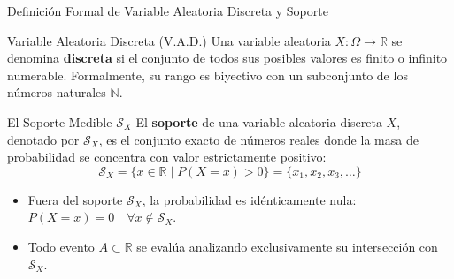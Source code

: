 \documentclass[10pt, aspectratio=169]{beamer}
\begin{document}
\begin{frame}{Definición Formal de Variable Aleatoria Discreta y Soporte}
  \fontsize{7.5pt}{9pt}\selectfont
  \begin{block}{Variable Aleatoria Discreta (V.A.D.)}
    \fontsize{7.5pt}{9pt}\selectfont
    Una variable aleatoria $X: \Omega \to \mathbb{R}$ se denomina \textbf{discreta} si el conjunto de todos sus posibles valores es finito o infinito numerable. Formalmente, su rango es biyectivo con un subconjunto de los números naturales $\mathbb{N}$.
  \end{block}
  \vspace{-0.15cm}
  \pause
  \begin{alertblock}{El Soporte Medible $\mathcal{S}_X$}
    \fontsize{7.5pt}{9pt}\selectfont
    El \textbf{soporte} de una variable aleatoria discreta $X$, denotado por $\mathcal{S}_X$, es el conjunto exacto de números reales donde la masa de probabilidad se concentra con valor estrictamente positivo:
    $$\mathcal{S}_X = \{x \in \mathbb{R} \mid P(X = x) > 0\} = \{x_1, x_2, x_3, \dots\}$$
    \begin{itemize}\itemsep=0.08cm
      \item Fuera del soporte $\mathcal{S}_X$, la probabilidad es idénticamente nula: $P(X = x) = 0 \quad \forall x \notin \mathcal{S}_X$.
      \item Todo evento $A \subset \mathbb{R}$ se evalúa analizando exclusivamente su intersección con $\mathcal{S}_X$.
    \end{itemize}
  \end{alertblock}
\end{frame}
\end{document}
